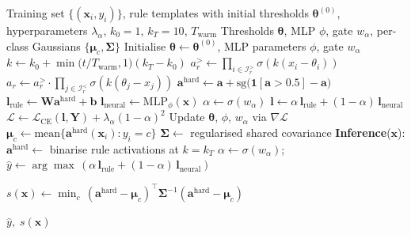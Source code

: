 \documentclass[journal]{IEEEtran}
\begin{document}
\begin{algorithm}[!ht]
\caption{NeSy-NIDS Training and OOD Scoring}
\label{alg:nesy}
\begin{algorithmic}[1]
\Require Training set $\{(\mathbf{x}_i, y_i)\}$, rule templates with
         initial thresholds $\boldsymbol{\theta}^{(0)}$,
         hyperparameters $\lambda_\alpha$,
         $k_0{=}1$, $k_T{=}10$, $T_{\mathrm{warm}}$
\Ensure  Thresholds $\boldsymbol{\theta}$, MLP $\phi$, gate $w_\alpha$,
         per-class Gaussians $\{\boldsymbol{\mu}_c, \boldsymbol{\Sigma}\}$
\State Initialise $\boldsymbol{\theta} \gets \boldsymbol{\theta}^{(0)}$,
       MLP parameters $\phi$, gate $w_\alpha$
  \State $k \gets k_0 + \min\!\bigl(t/T_{\mathrm{warm}},1\bigr)(k_T - k_0)$
      \State $a_r^{>} \gets \prod_{i\in\mathcal{I}_r^{>}}\!\sigma(k(x_i{-}\theta_i))$
      \State $a_r \gets a_r^{>} \cdot \prod_{j\in\mathcal{I}_r^{<}}\!\sigma(k(\theta_j{-}x_j))$
    \EndFor
    \State $\mathbf{a}^{\!\mathrm{hard}} \gets \mathbf{a}
           + \mathrm{sg}\!\bigl(\mathbf{1}[\mathbf{a}{>}0.5]-\mathbf{a}\bigr)$
    \State $\mathbf{l}_{\mathrm{rule}} \gets \mathbf{W}\mathbf{a}^{\mathrm{hard}}\!+\!\mathbf{b}$
    \State $\mathbf{l}_{\mathrm{neural}} \gets \mathrm{MLP}_\phi(\mathbf{x})$
    \State $\alpha \gets \sigma(w_\alpha)$
    \State $\mathbf{l} \gets \alpha\,\mathbf{l}_{\mathrm{rule}} + (1{-}\alpha)\,\mathbf{l}_{\mathrm{neural}}$
    \State $\mathcal{L} \gets \mathcal{L}_{\mathrm{CE}}(\mathbf{l},\mathbf{Y}) + \lambda_\alpha(1{-}\alpha)^2$
    \State Update $\boldsymbol{\theta}$, $\phi$, $w_\alpha$ via $\nabla\mathcal{L}$
  \EndFor
\EndFor
{} 
  \State $\boldsymbol{\mu}_c \gets \mathrm{mean}\{\mathbf{a}^{\mathrm{hard}}(\mathbf{x}_i) : y_i = c\}$
\EndFor
\State $\boldsymbol{\Sigma} \gets$ regularised shared covariance
\Statex
\Statex \textbf{Inference}($\mathbf{x}$):
\State $\mathbf{a}^{\mathrm{hard}} \gets$ binarise rule activations at $k{=}k_T$
\State $\alpha \gets \sigma(w_\alpha)$;\quad
       $\hat{y} \gets \arg\max\,(\alpha\,\mathbf{l}_{\mathrm{rule}} + (1{-}\alpha)\,\mathbf{l}_{\mathrm{neural}})$
\State \parbox[t]{\dimexpr\linewidth-\algorithmicindent}{%
  $s(\mathbf{x}) \gets \min_c\,(\mathbf{a}^{\mathrm{hard}}-\boldsymbol{\mu}_c)^\top
  \boldsymbol{\Sigma}^{-1}(\mathbf{a}^{\mathrm{hard}}-\boldsymbol{\mu}_c)$
  \hfill{}}
\State \Return $\hat{y},\; s(\mathbf{x})$
\end{algorithmic}
\end{algorithm}
\end{document}
